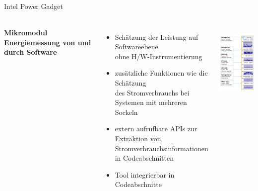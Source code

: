 \begin{frame}{Intel Power Gadget}\begin{columns}
\framesubtitle{Mikromodul Energiemessung von und durch Software}
\column{8cm}


\begin{itemize}
  \item  Schätzung der Leistung auf Softwareebene\\
	       ohne H/W-Instrumentierung 
	\item zusätzliche Funktionen wie die Schätzung \\
	         des Stromverbrauchs bei Systemen mit mehreren Sockeln 
	\item extern aufrufbare APIs zur Extraktion von \\
	           Stromverbrauchsinformationen in Codeabschnitten
	\item  Tool  integrierbar in Codeabschnitte 
\end{itemize}
\column{4cm}
~\\[-32mm]\hspace*{\fill}
\includegraphics[width=4cm]{../Figures/PowerGadget.png}


\end{columns}
\end{frame}

